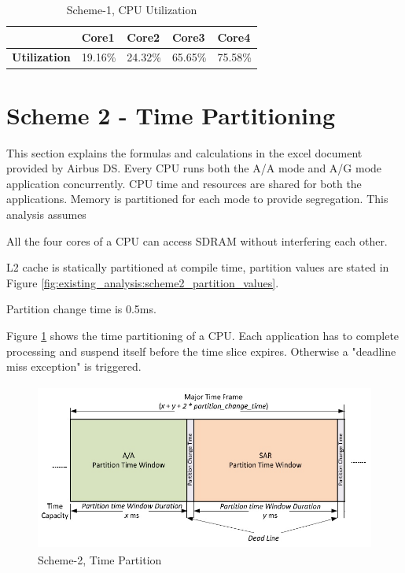 \begin{table}[h!]
	\centering
	\begin{tabular}{|l|l|l|l|l|} 
	 \hline
	& \textbf{Core1} & \textbf{Core2} & \textbf{Core3} & \textbf{Core4} \\ \hline
	\textbf{Utilization} & 19.16\% & 24.32\% & 65.65\% & 75.58\% \\ \hline
	\end{tabular}
	\caption{Scheme-1, CPU Utilization}
\end{table}



\clearpage
\section{Scheme 2 - Time Partitioning}
\label{sec:scheme2}
This section explains the formulas and calculations in the excel document provided by Airbus DS. Every CPU runs both the A/A mode and A/G mode application concurrently. CPU time and resources are shared for both the applications. Memory is partitioned for each mode to provide segregation. This analysis assumes
\begin{compactitem}
	\item All the four cores of a CPU can access SDRAM without interfering each other.
	\item L2 cache is statically partitioned at compile time, partition values are stated in Figure \ref{fig:existing_analysis:scheme2_partition_values}.
	\item Partition change time is 0.5ms. 
\end{compactitem} 

Figure \ref{fig:existing_analysis:scheme2_partition} shows the time partitioning of a CPU. Each application has to complete processing and suspend itself before the time slice expires. Otherwise a "deadline miss exception" is triggered.

\begin{figure}[h!]
	\centering
	\includegraphics[height=55mm]{figures/scheme2_partition}
	\caption{Scheme-2, Time Partition}
	\label{fig:existing_analysis:scheme2_partition}
\end{figure}

